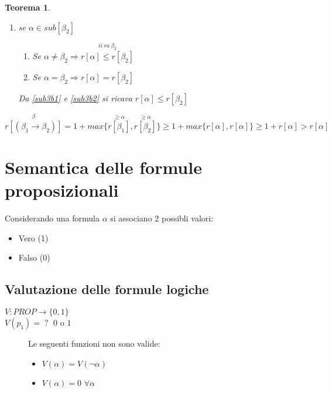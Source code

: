\documentclass{article}
\newtheorem{theorem}{Teorema}
\theoremstyle{break}
\theoremstyle{break}
\theoremstyle{break}
\theoremstyle{break}
\begin{document}
\begin{theorem}
\begin{enumerate}
\begin{enumerate}
\begin{enumerate}
			            \end{enumerate}
			            Da \ref{sub3a1} e \ref{sub3a2} si ricava \( r[\alpha] \le r[\beta_1] \)
			      \item se \( \alpha \in sub[\beta_2] \)
			            \begin{enumerate}
				            \item \label{sub3b1} Se \( \alpha \neq \beta_2 \Rightarrow
				                  \stackrel{ii\: su\: \beta_{2} }{r[\alpha] \le r[\beta_2]} \)
				            \item \label{sub3b2} Se \( \alpha = \beta_2 \Rightarrow r[\alpha] = r[\beta_2]\)
			            \end{enumerate}
			            Da \ref{sub3b1} e \ref{sub3b2} si ricava \( r[\alpha] \le r[\beta_2] \)
		      \end{enumerate}
		      \[
			      \stackrel{\beta}{r[(\beta_1 \to \beta_2)]} = 1 + max\{\stackrel{\ge \alpha}{r[\beta_1]}
			      ,\stackrel{\ge \alpha}{r[\beta_2]}\}\ge 1+ max\{r[\alpha], r[\alpha]\}
			      \ge 1+ r[\alpha] > r[\alpha]
		      \]
	\end{enumerate}
\end{theorem}

\section{Semantica delle formule proposizionali}
Considerando una formula \( \alpha \) si associano 2 possibli valori:
\begin{itemize}
	\item Vero (1)
	\item Falso (0)
\end{itemize}

\subsection{Valutazione delle formule logiche}
\( V: PROP \to \{ 0, 1 \} \)\\
\( V(p_1) =\; ?\;\) \( 0 \) o \( 1 \)
\begin{figure}[H]
	\begin{example}
		Le seguenti funzioni non sono valide:
		\begin{itemize}
			\item \( V(\alpha) = V(\neg \alpha) \)
			\item \( V(\alpha) = 0 \) \( \forall \alpha \)
		\end{itemize}
	\end{example}
\end{figure}
\end{document}
